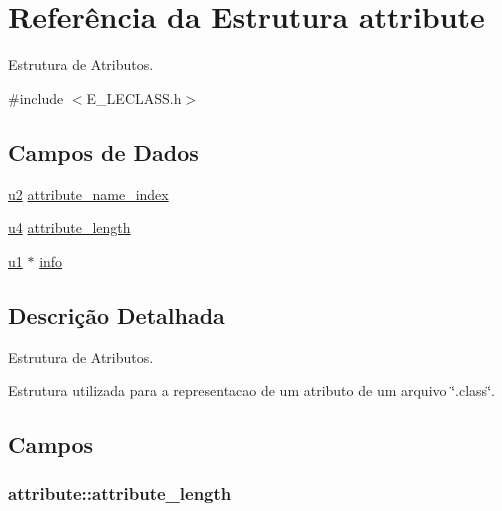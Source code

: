 \hypertarget{structattribute}{}\section{Referência da Estrutura attribute}
\label{structattribute}


Estrutura de Atributos.  




{\ttfamily \#include $<$E\+\_\+\+L\+E\+C\+L\+A\+S\+S.\+h$>$}

\subsection*{Campos de Dados}
\begin{DoxyCompactItemize}
\item 
\hyperlink{_e___l_e_c_l_a_s_s_8h_a5f223212eef04d10a4550ded680cb1cf}{u2} \hyperlink{structattribute_a55761ad4a2ed18b8f88baf6ac062cb46}{attribute\+\_\+name\+\_\+index}
\item 
\hyperlink{_e___l_e_c_l_a_s_s_8h_aedf6ddc03df8caaaccbb4c60b9a9b850}{u4} \hyperlink{structattribute_a3d9b605228c53c92be5e5b49ff24a35c}{attribute\+\_\+length}
\item 
\hyperlink{_e___l_e_c_l_a_s_s_8h_a216a9f8b04b4f0af84a4ca9d1d85a6ca}{u1} $\ast$ \hyperlink{structattribute_ac749b125ccc9eda0cfe9deb4fe4aeda9}{info}
\end{DoxyCompactItemize}


\subsection{Descrição Detalhada}
Estrutura de Atributos. 

Estrutura utilizada para a representacao de um atributo de um arquivo \char`\"{}.\+class\char`\"{}. 

\subsection{Campos}
\hypertarget{structattribute_a3d9b605228c53c92be5e5b49ff24a35c}{}
\subsubsection[{attribute\+\_\+length}]{ attribute\+::attribute\+\_\+length}\label{structattribute_a3d9b605228c53c92be5e5b49ff24a35c}
\hypertarget{structattribute_a55761ad4a2ed18b8f88baf6ac062cb46}{}
